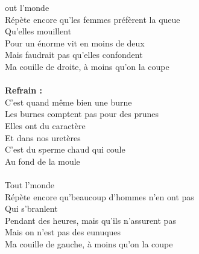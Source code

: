 
out l’monde 
\\Répète encore qu’les femmes préfèrent la queue 
\\Qu’elles mouillent 
\\Pour un énorme vit en moins de deux 
\\Mais faudrait pas qu’elles confondent 
\\Ma couille de droite, à moins qu’on la coupe 
\\\\\textbf{Refrain : }
\\C’est quand même bien une burne
\\Les burnes comptent pas pour des prunes 
\\Elles ont du caractère 
\\Et dans nos uretères 
\\C’est du sperme chaud qui coule 
\\Au fond de la moule
\\\\Tout l’monde 
\\Répète encore qu’beaucoup d’hommes n’en ont pas 
\\Qui s’branlent 
\\Pendant des heures, mais qu’ils n’assurent pas 
\\Mais on n’est pas des eunuques 
\\Ma couille de gauche, à moins qu’on la coupe

\breakpage